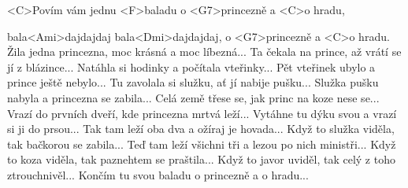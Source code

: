 
\zs
<C>Povím vám jednu <F>baladu o <G7>princezně a <C>o hradu,

bala<Ami>dajdajdaj bala<Dmi>dajdajdaj, o <G7>princezně a <C>o hradu.
\ks
\zs
Žila jedna princezna, moc krásná a moc líbezná...
\ks
\zs
Ta čekala na prince, až vrátí se jí z blázince...
\ks
\zs
Natáhla si hodinky a počítala vteřinky...
\ks
\zs
Pět vteřinek ubylo a prince ještě nebylo...
\ks
\zs
Tu zavolala si služku, ať jí nabije pušku...
\ks
\zs
Služka pušku nabyla a princezna se zabila...
\ks
\zs
Celá země třese se, jak princ na koze nese se...
\ks
\zs
Vrazí do prvních dveří, kde princezna mrtvá leží...
\ks
\zs
Vytáhne tu dýku svou a vrazí si ji do prsou...
\ks
\zs
Tak tam leží oba dva a ožíraj je hovada...
\ks
\zs
Když to služka viděla, tak bačkorou se zabila...
\ks
\zs
Teď tam leží všichni tři a lezou po nich ministři...
\ks
\zs
Když to koza viděla, tak paznehtem se praštila...
\ks
\zs
Když to javor uviděl, tak celý z toho ztrouchnivěl...
\ks
\zs
Končím tu svou baladu o princezně a o hradu...
\ks

\kp
